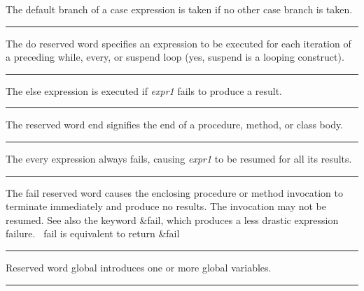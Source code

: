 \noindent
{}The \textsf{default} branch of a case
expression is taken if no other case branch is taken.

\bigskip\hrule\vspace{0.1cm}

\noindent
{}The \textsf{do} reserved word specifies an
expression to be executed for each iteration of a preceding
\textsf{while}, \textsf{every}, or \textsf{suspend} loop (yes,
\textsf{suspend} is a looping construct).

\bigskip\hrule\vspace{0.1cm}

\noindent
{}The \textsf{else} expression is executed if \textit{expr1}
fails to produce a result.

\bigskip\hrule\vspace{0.1cm}

\noindent
{}The reserved word \textsf{end} signifies the end of a
procedure, method, or class body.

\bigskip\hrule\vspace{0.1cm}

\noindent
{}The \textsf{every} expression always fails, causing
\textit{expr1} to be resumed for all its results.

\bigskip\hrule\vspace{0.1cm}

\noindent
{}The \textsf{fail} reserved word causes the enclosing
procedure or method invocation to terminate immediately and produce no
results. The invocation may not be resumed. See also the keyword
\textsf{\&fail}, which produces a less drastic expression failure.
\ \textsf{fail} is equivalent to \textsf{return \&fail}

\bigskip\hrule\vspace{0.1cm}

\noindent
{}Reserved word \textsf{global} introduces one or more
global variables.

\bigskip\hrule\vspace{0.1cm}

